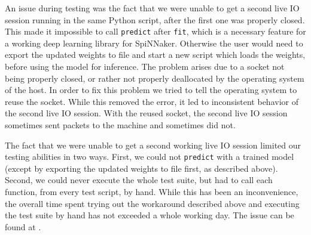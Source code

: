 \documentclass[]{article}
\begin{document}
An issue during testing was the
fact that we were unable to get a second live IO session running in
the same Python script, after the first one was properly closed.
This made it impossible to call \texttt{predict} after \texttt{fit},
which is a necessary feature for a working deep learning library for
SpiNNaker.
Otherwise the user would need to export the updated weights to file
and start a new script which loads the weights, before using the
model for inference.
The problem arises due to a socket not being properly closed, or
rather not properly deallocated by the operating system of the host.
In order to fix this problem we tried to tell the operating system to
reuse the socket.
While this removed the error, it led to inconsistent behavior of the
second live IO session.
With the reused socket, the second live IO session sometimes sent
packets to the machine and sometimes did not.

The fact that we were unable to get a second working live IO session
limited our testing abilities in two ways.
First, we could not \texttt{predict} with a trained model (except by
exporting the updated weights to file first, as described above).
Second, we could never execute the whole test suite, but had to
call each function, from every test script, by hand.
While this has been an inconvenience, the overall time spent trying
out the workaround described above and executing the test
suite by hand has not exceeded a whole working day.
The issue can be found at \citep{fassbender_2020d}.
\end{document}

